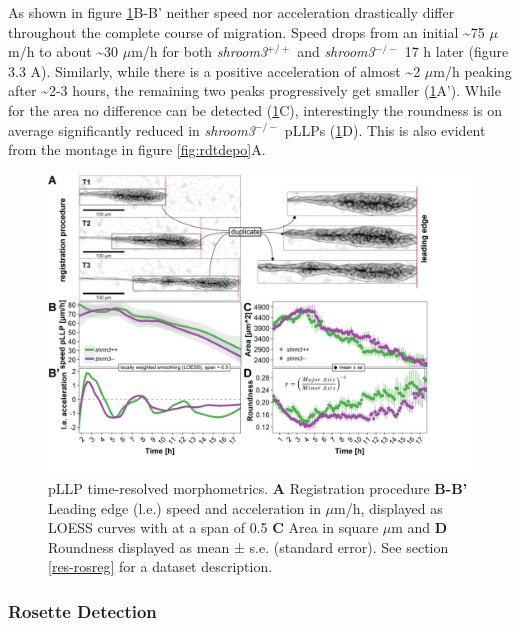 \documentclass[10pt, b5paper, singlespacinge, twoside]{reedthesis} %
\theoremstyle{definition}
\theoremstyle{definition}
\theoremstyle{definition}
\theoremstyle{remark}
\begin{document}
As shown in figure \ref{fig:rdtreg}B-B' neither speed nor acceleration drastically differ throughout the complete course of migration. Speed drops from an initial \textasciitilde75 \(\mu\)m/h to about \textasciitilde30 \(\mu\)m/h for both \emph{shroom3}\(^{+/+}\) and \emph{shroom3}\(^{-/-}\) 17 h later (figure 3.3 A). Similarly, while there is a positive acceleration of almost \textasciitilde2 \(\mu\)m/h peaking after \textasciitilde2-3 hours, the remaining two peaks progressively get smaller (\ref{fig:rdtreg}A').
While for the area no difference can be detected (\ref{fig:rdtreg}C), interestingly the roundness is on average significantly reduced in \emph{shroom3}\(^{-/-}\) pLLPs (\ref{fig:rdtreg}D). This is also evident from the montage in figure \ref{fig:rdtdepo}A.


\begin{figure}

{\centering \includegraphics[width=0.95\linewidth]{figures/results/03_rosettes/registration} 

}

\caption[pLLP time-resolved morphometrics]{pLLP time-resolved morphometrics. \textbf{A} Registration procedure \textbf{B-B'} Leading edge (l.e.) speed and acceleration in \(\mu\)m/h, displayed as LOESS curves with at a span of 0.5 \textbf{C} Area in square \(\mu\)m and \textbf{D} Roundness displayed as mean ± s.e. (standard error). See section \ref{res-rosreg} for a dataset description.}\label{fig:rdtreg}
\end{figure}
\hypertarget{res-rdtdet}{%
\subsubsection{Rosette Detection}\label{res-rdtdet}}
\end{document}
